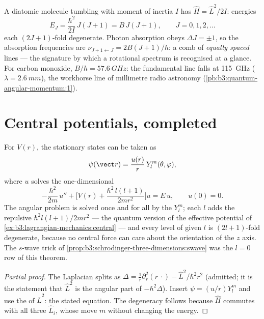 \begin{example}\label{ex:b3:quantum-angular-momentum:rotor}
A diatomic molecule tumbling with moment of inertia $I$ has $\hat H
= \hat L^2/2I$: energies
\[
E_J = \frac{\hbar^2}{2I}\,J(J+1) = B\,J(J+1) ,
\qquad J = 0, 1, 2, \dots
\]
each $(2J+1)$-fold degenerate. Photon absorption obeys $\Delta J =
\pm1$, so the absorption frequencies are $\nu_{J+1\leftarrow J} =
2B(J+1)/h$: a comb of \emph{equally spaced} lines --- the signature
by which a rotational spectrum is recognised at a glance. For carbon
monoxide, $B/h = \qty{57.6}{GHz}$: the fundamental line falls at
\qty{115}{GHz} ($\lambda = \qty{2.6}{mm}$), the workhorse line of
millimetre radio astronomy
(\cref{pb:b3:quantum-angular-momentum:1}).
\end{example}

\section{Central potentials, completed}

\begin{theorem}\label{thm:b3:quantum-angular-momentum:radial}
For $V(r)$, the stationary states can be taken as
\[
\psi(\vect r) = \frac{u(r)}{r}\,Y_l^m(\theta, \varphi) ,
\]
where $u$ solves the one-dimensional 
\[
-\frac{\hbar^2}{2m}\,u'' + \Big[V(r) +
\frac{\hbar^2\,l(l+1)}{2mr^2}\Big]u = E\,u , \qquad u(0) = 0 .
\]
The angular problem is solved once and for all by the $Y_l^m$; each
$l$ adds the repulsive \emph{}
$\hbar^2l(l+1)/2mr^2$ --- the quantum version of the effective
potential of \cref{ex:b3:lagrangian-mechanics:central} --- and every
level of given $l$ is $(2l+1)$-fold degenerate, because no central
force can care about the orientation of the $z$ axis. The $s$-wave
trick of \cref{prop:b3:schrodinger-three-dimensions:swave} was the
$l = 0$ row of this theorem.
\end{theorem}

\begin{proof}[Partial proof]
The Laplacian splits as $\Delta = \tfrac1r\partial_r^2(r\,\cdot) -
\hat L^2/\hbar^2r^2$ (admitted; it is the statement that $\hat L^2$
is the angular part of $-\hbar^2\Delta$). Insert $\psi = (u/r)Y_l^m$
and use the  of $\hat L^2$: the stated equation. The
degeneracy follows because $\hat H$ commutes with all three $\hat
L_i$, whose  move $m$ without changing the energy.
\end{proof}

